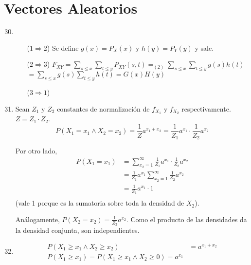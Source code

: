\section{Vectores Aleatorios}
\begin{enumerate}
	\setcounter{enumi}{29}
  
	\item \hfill
  
		\begin{itemize}			
    	
			\item[($1\Rightarrow 2$)]
				Se define $g(x) = P_X(x)$ y $h(y) = P_Y(y)$ y sale.
			
			\item[($2\Rightarrow 3$)]
				$F_{XY} = \sum_{s \leq x}^{} \sum_{t \leq y}^{} P_{XY}(s,t) =_{(2)}  \sum_{s \leq x}^{} \sum_{t \leq y}^{} g(s)h(t)$ \\ 
        $ = \sum_{s \leq x}^{} g(s) \sum_{t \leq y}^{} h(t) = G(x) H(y) $
				
      \item[($3\Rightarrow 1$)]
        

		\end{itemize}
    
	\item
		Sean $Z_1$ y $Z_2$ constantes de normalización de $f_{X_1}$ y $f_{X_2}$ respectivamente. $Z = Z_1\cdot Z_2$.
		$$P(X_1 = x_1 \land X_2 = x_2) = \frac{1}{Z}a^{x_1+x_2} = \frac{1}{Z_1}a^{x_1}\cdot \frac{1}{Z_2}a^{x_2}$$
		
		Por otro lado,
		\begin{align*}
			P(X_1 = x_1) & = \sum_{x_2 = 1}^{\infty} \frac{1}{Z_1}a^{x_1}\cdot \frac{1}{Z_2}a^{x_2} \\
			             & = \frac{1}{Z_1}a^{x_1} \sum_{x_2 = 1}^{\infty} \frac{1}{Z_2}a^{x_2} \\
			             & = \frac{1}{Z_1}a^{x_1} \cdot 1 \\
		\end{align*}
		(vale 1 porque es la sumatoria sobre toda la densidad de $X_2$).
		
		Análogamente, $P(X_2 = x_2) = \frac{1}{Z_2}a^{x_2}$. Como el producto de las densidades da la densidad conjunta, son independientes.
		
	\item
		\begin{align*}
			P(X_1 \geq x_1 \land X_2 \geq x_2)	& = a^{x_1 + x_2}			\\
			P(X_1 \geq x_1) = P(X_1 \geq x_1 \land X_2 \geq 0) = a^{x_1}
		\end{align*}
		

\end{enumerate}
